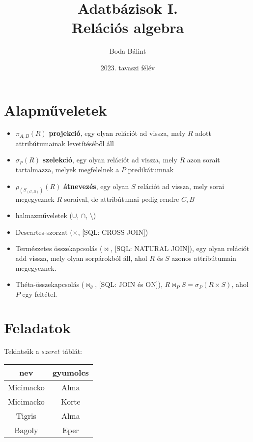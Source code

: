 \documentclass[a4paper,12pt]{article}
\title{\large{Adatbázisok I.} \\[-4pt] \huge{Relációs algebra} \\[-12pt]  \vspace{-15pt}}
\author{Boda Bálint}
\date{\vspace{-12pt}2023. tavaszi félév}
\theoremstyle{definition}
\begin{document}
\maketitle

\section{Alapműveletek}
\begin{itemize}
	\item {
		$ \pi_{A,B}{\left( R \right) } $ \textbf{projekció}, egy olyan relációt ad vissza, mely $R$ adott attribútumainak levetítéséből áll
	}
	\item {
		$ \sigma_{P}{\left( R \right)} $ \textbf{szelekció}, egy olyan relációt ad vissza, mely $R$ azon sorait tartalmazza, melyek megfelelnek a $P$ predikátumnak
	}
	\item {
		$ \rho_{(S_{(C,B)})}{\left( R \right)} $ \textbf{átnevezés}, egy olyan $S$ relációt ad vissza, mely sorai megegyeznek $R$ soraival, de attribútumai pedig rendre $ C,B $
	}
	\item {
		halmazműveletek ($ \cup $, $ \cap $, $ \setminus $)
	}
	\item {
		Descartes-szorzat ($ \times $, [SQL: CROSS JOIN])
	}
	\item {
	Természetes összekapcsolás ($ \bowtie $, [SQL: NATURAL JOIN]), egy olyan relációt add vissza, mely olyan sorpárokból áll, ahol $ R $ és $ S $ azonos attribútumain megegyeznek.
	}

	\item {
		Théta-összekapcsolás ($ \bowtie_\theta $, [SQL: JOIN és ON]), $ R \bowtie_P S = \sigma_P{\left( R \times S \right) } $, ahol $P$ egy feltétel.
	}
\end{itemize}
\section{Feladatok}
Tekintsük a $ szeret $ táblát:
\begin{table}[H]
	\centering
	\begin{tabular}{|c|c|}
		\hline
		nev & gyumolcs \\
		\hline
		Micimacko & Alma \\
		\hline
		Micimacko & Korte \\
		\hline
		Tigris & Alma \\
		\hline
		Bagoly & Eper \\
		\hline
	\end{tabular}
\end{table}
	
\end{document}
